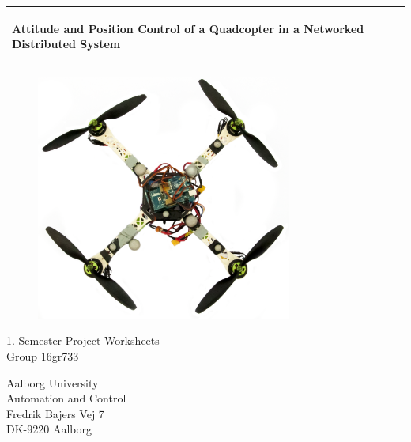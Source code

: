 %
\begin{titlepage}
  \addtolength{\hoffset}{0.5\evensidemargin-0.5\oddsidemargin} %
  \noindent%
  \begin{tabular}{@{}p{\textwidth}@{}}
    \toprule[2pt]
    \midrule
    \vspace{0.2cm}
    \begin{center}
    \Huge{\textbf{
      Attitude and Position Control of a Quadcopter in a Networked Distributed System}}
    \end{center}
	\vspace{0.19cm} \\
    \midrule
    \toprule[2pt]
  \end{tabular}
   \vspace{0.23 cm}
  \begin{figure}[!ht]
\centering
\includegraphics[width=0.75\textwidth]{figures/FrontPageCropped}
\label{fig:forside}
\end{figure}
  \vspace{-0.6 cm}
  \begin{center}
    {\large
      1. Semester Project Worksheets %
    }\\
    \vspace{0.1 cm}
    {\Large
      Group 16gr733%
    }
  \end{center}
  \vspace{-0.45 cm}
  \begin{center}
  Aalborg University\\
  Automation and Control\\
  Fredrik Bajers Vej 7\\
  DK-9220 Aalborg
  \end{center}
\end{titlepage}

\clearpage